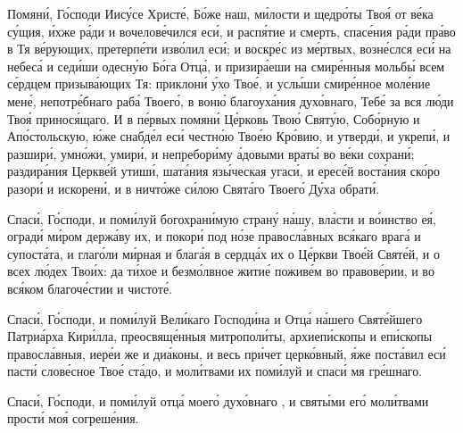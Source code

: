 \begin{mymulticols}


Помян\'{и}, Г\'{о}споди Иис\'{у}се Христ\'{е}, Б\'{о}же наш, м\'{и}лости и щедр\'{о}ты Тво\'{я} от в\'{е}ка с\'{у}щия, \'{и}хже р\'{а}ди и вочелов\'{е}чился ес\'{и}, и расп\'{я}тие и смерть, спас\'{е}ния р\'{а}ди пр\'{а}во в Тя в\'{е}рующих, претерп\'{е}ти изв\'{о}лил ес\'{и}; и воскр\'{е}с из м\'{е}ртвых, возн\'{е}слся ес\'{и} на небес\'{а} и сед\'{и}ши одесн\'{у}ю Б\'{о}га Отц\'{а}, и призир\'{а}еши на смир\'{е}нныя мольб\'{ы} всем с\'{е}рдцем призыв\'{а}ющих Тя: приклон\'{и} \'{у}хо Тво\'{е}, и усл\'{ы}ши смир\'{е}нное мол\'{е}ние мен\'{е}, непотр\'{е}бнаго раб\'{а} Твоег\'{о}, в вон\'{ю} благоух\'{а}ния дух\'{о}внаго, Теб\'{е} за вся л\'{ю}ди Тво\'{я} принос\'{я}щаго. И в п\'{е}рвых помян\'{и} Ц\'{е}рковь Тво\'{ю} Свят\'{у}ю, Соб\'{о}рную и Ап\'{о}стольскую, \'{ю}же снабд\'{е}л ес\'{и} честн\'{о}ю Тво\'{е}ю Кр\'{о}вию, и утверд\'{и}, и укреп\'{и}, и разшир\'{и}, умн\'{о}жи, умир\'{и}, и непребор\'{и}му \'{а}довыми врат\'{ы} во в\'{е}ки сохран\'{и}; раздир\'{а}ния Церкв\'{е}й утиш\'{и}, шат\'{а}ния яз\'{ы}ческая угас\'{и}, и ерес\'{е}й вост\'{а}ния ск\'{о}ро разор\'{и} и искорен\'{и}, и в ничт\'{о}же с\'{и}лою Свят\'{а}го Твоег\'{о} Д\'{у}ха обрат\'{и}. 

Спас\'{и}, Г\'{о}споди, и пом\'{и}луй богохран\'{и}мую стран\'{у} н\'{а}шу, вл\'{а}сти и в\'{о}инство е\'{я}, оград\'{и} м\'{и}ром держ\'{а}ву их, и покор\'{и} под н\'{о}зе правосл\'{а}вных вс\'{я}каго враг\'{а} и супост\'{а}та, и глаг\'{о}ли м\'{и}рная и благ\'{а}я в сердц\'{а}х их о Ц\'{е}ркви Тво\'{е}й Свят\'{е}й, и о всех л\'{ю}дех Тво\'{и}х: да т\'{и}хое и безм\'{о}лвное жити\'{е} пожив\'{е}м во правов\'{е}рии, и во вс\'{я}ком благоч\'{е}стии и чистот\'{е}. 

Спас\'{и}, Г\'{о}споди, и пом\'{и}луй Вел\'{и}каго Господ\'{и}на и Отц\'{а} н\'{а}шего Свят\'{е}йшего Патри\'{а}рха Кир\'{и}лла, преосвящ\'{е}нныя митропол\'{и}ты, архиеп\'{и}скопы и еп\'{и}скопы правосл\'{а}вныя, иер\'{е}и же и ди\'{а}коны, и весь пр\'{и}чет церк\'{о}вный, \'{я}же пост\'{а}вил ес\'{и} паст\'{и} слов\'{е}сное Тво\'{е} ст\'{а}до, и мол\'{и}твами их пом\'{и}луй и спас\'{и} мя гр\'{е}шнаго. 

Спас\'{и}, Г\'{о}споди, и пом\'{и}луй отц\'{а} моег\'{о} дух\'{о}внаго , и свят\'{ы}ми ег\'{о} мол\'{и}твами прост\'{и} мо\'{я} согреш\'{е}ния. 


\end{mymulticols}
